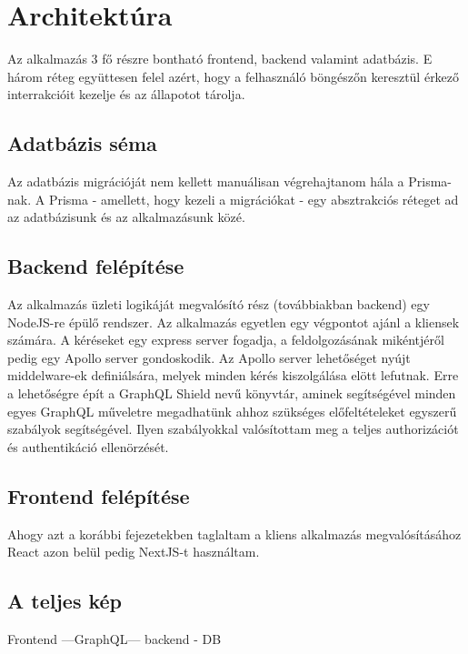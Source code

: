 \chapter{Architektúra}
Az alkalmazás 3 fő részre bontható frontend, backend valamint adatbázis.
E három réteg együttesen felel azért, hogy a felhasználó böngészőn keresztül érkező interrakcióit kezelje és az állapotot tárolja.

\section{Adatbázis séma}
Az adatbázis migrációját nem kellett manuálisan végrehajtanom hála a Prisma-nak. 
A Prisma - amellett, hogy kezeli a migrációkat - egy absztrakciós réteget ad az adatbázisunk és az alkalmazásunk közé.

\section{Backend felépítése}
Az alkalmazás üzleti logikáját megvalósító rész (továbbiakban backend) egy NodeJS-re épülő rendszer.
Az alkalmazás egyetlen egy végpontot ajánl a kliensek számára.
A kéréseket egy express server fogadja, a feldolgozásának mikéntjéről pedig egy Apollo server gondoskodik.
Az Apollo server lehetőséget nyújt middelware-ek definiálsára, melyek minden kérés kiszolgálása elött lefutnak.
Erre a lehetőségre épít a GraphQL Shield nevű könyvtár, aminek segítségével minden egyes GraphQL műveletre megadhatünk ahhoz szükséges előfeltételeket egyszerű szabályok segítségével.
Ilyen szabályokkal valósítottam meg a teljes authorizációt és authentikáció ellenörzését.

\section{Frontend felépítése}
Ahogy azt a korábbi fejezetekben taglaltam a kliens alkalmazás megvalósításához React azon belül pedig NextJS-t használtam.

\section{A teljes kép}
Frontend ---GraphQL--- backend - DB
